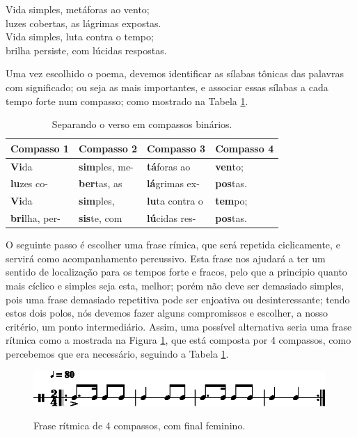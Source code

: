 \begin{citando}
Vida simples, metáforas ao vento;\\
luzes cobertas, as lágrimas expostas.\\
Vida simples, luta contra o tempo;\\
brilha persiste, com lúcidas respostas.
\end{citando}

Uma vez escolhido o poema, 
devemos identificar as sílabas tônicas das palavras com significado;
ou seja as mais importantes, e associar essas sílabas a cada tempo forte num compasso;
como mostrado na Tabela \ref{tab:verso1}.

\begin{table}[h!]
\begin{center}
\begin{tabular}{|l||l||l||l|} %
\hline
Compasso 1 & Compasso 2   & Compasso 3   & Compasso 4 \\ \hline \hline
\textbf{Vi}da       & \textbf{sim}ples, me- & \textbf{tá}foras ao    & \textbf{ven}to;  \\ \hline
\textbf{lu}zes  co- & \textbf{ber}tas, as   & \textbf{lá}grimas ex-  & \textbf{pos}tas. \\ \hline
\textbf{Vi}da       & \textbf{sim}ples, & \textbf{lu}ta contra o & \textbf{tem}po;  \\ \hline
\textbf{bri}lha, per-& \textbf{sis}te, com   & \textbf{lú}cidas res-  & \textbf{pos}tas. \\ \hline
\end{tabular}
\caption{Separando o verso em compassos binários.}
\label{tab:verso1}
\end{center}
\end{table}

O seguinte passo é escolher uma frase rímica, que será repetida ciclicamente,
 e servirá como acompanhamento percussivo.
Esta frase nos ajudará a ter um sentido de localização para os tempos forte e fracos,
pelo que a principio quanto mais cíclico e simples seja esta, melhor;
porém não deve ser demasiado simples, 
pois uma frase demasiado repetitiva pode ser enjoativa ou desinteressante;
tendo estos dois polos, 
nós devemos fazer alguns compromissos e escolher, a nosso critério, um ponto intermediário. 
Assim, uma possível alternativa seria uma frase rítmica como a mostrada na Figura \ref{rap:emocional-protesto1},
que está composta por 4 compassos, como percebemos que era necessário, 
seguindo a Tabela \ref{tab:verso1}.

\begin{figure}[h!]
\centering
    \centering
    \href{https://drive.google.com/file/d/1LFAd73PHwjuau6o3aBQ32EyxmF61UAsg/view?usp=sharing}{\includegraphics[width=0.99\textwidth]{chapters/cap-musicalidade-tecnica/rap-treino-1-1.eps}}
\caption{Frase rítmica de 4 compassos, com final feminino.}
\label{rap:emocional-protesto1}
\end{figure}

